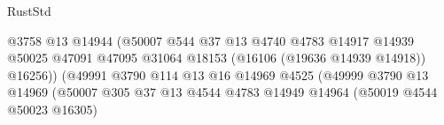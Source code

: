 \begin{lexlean}{RustStd}
\begin{coremodule}
                                                            @3758
                                                            @13
                                                            @14944
                                                            (@50007
                                                              @544
                                                              @37
                                                              @13
                                                              @4740
                                                              @4783
                                                              @14917
                                                              @14939
                                                              @50025
                                                              @47091
                                                              @47095
                                                              @31064
                                                              @18153
                                                              (@16106 (@19636 @14939 @14918))
                                                              @16256))
                                                          (@49991
                                                            @3790
                                                            @114
                                                            @13
                                                            @16
                                                            @14969
                                                            @4525
                                                            (@49999
                                                              @3790
                                                              @13
                                                              @14969
                                                              (@50007
                                                                @305
                                                                @37
                                                                @13
                                                                @4544
                                                                @4783
                                                                @14949
                                                                @14964
                                                                (@50019 @4544 @50023 @16305)

\end{coremodule}
\end{lexlean}
